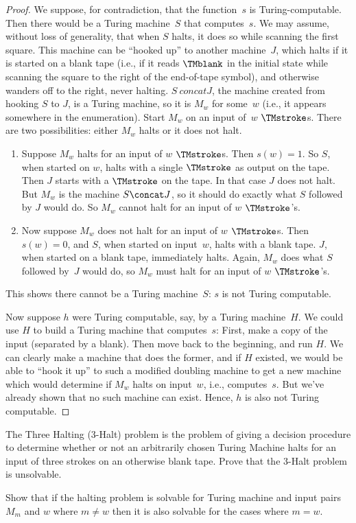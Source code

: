 \documentclass[../../../include/open-logic-section]{subfiles}
\begin{document}
\begin{proof}
We suppose, for contradiction, that the function~$s$ is
Turing-computable.  Then there would be a Turing machine~$S$ that
computes~$s$. We may assume, without loss of generality, that when $S$
halts, it does so while scanning the first square.  This machine can
be ``hooked up'' to another machine~$J$, which halts if it is started on a
blank tape (i.e., if it reads $\TMblank$ in the initial state while
scanning the square to the right of the end-of-tape symbol), and
otherwise wanders off to the right, never halting. $S \ concat J$, the
machine created from hooking $S$ to $J$, is a Turing machine, so it is
$M_w$ for some~$w$ (i.e., it appears somewhere in the enumeration). Start $M_w$
on an input of~$w$ $\TMstroke$s. There are two possibilities: either
$M_w$ halts or it does not halt.
\begin{enumerate}
\item Suppose $M_w$ halts for an input of $w$ $\TMstroke$s. Then $s(w)
  = 1$. So $S$, when started on $w$, halts with a single $\TMstroke$
  as output on the tape.  Then $J$ starts with a $\TMstroke$ on the
  tape. In that case $J$ does not halt. But $M_w$ is the machine $S
  \concat J$, so it should do exactly what $S$ followed by $J$ would
  do.  So $M_w$ cannot halt for an input of $w$ $\TMstroke$'s.

\item Now suppose $M_w$ does not halt for an input of $w$
  $\TMstroke$s.  Then $s(w) = 0$, and $S$, when started on input~$w$,
  halts with a blank tape.  $J$, when started on a blank tape,
  immediately halts.  Again, $M_w$ does what $S$ followed by~$J$ would
  do, so $M_w$ must halt for an input of $w$ $\TMstroke$'s.
\end{enumerate}
This shows there cannot be a Turing machine~$S$: $s$ is not Turing
computable.

Now suppose $h$ were Turing computable, say, by a Turing machine~$H$.
We could use $H$ to build a Turing machine that computes~$s$: First,
make a copy of the input (separated by a blank). Then move back to the
beginning, and run $H$.  We can clearly make a machine that does the
former, and if $H$ existed, we would be able to ``hook it up'' to such
a modified doubling machine to get a new machine which would determine
if $M_w$ halts on input~$w$, i.e., computes~$s$. But we've already
shown that no such machine can exist. Hence, $h$ is also not Turing
computable.
\end{proof}

\begin{prob}
The Three Halting (3-Halt) problem is the problem of giving a decision
procedure to determine whether or not an arbitrarily chosen Turing
Machine halts for an input of three strokes on an otherwise blank
tape. Prove that the 3-Halt problem is unsolvable.
\end{prob}

\begin{prob}
Show that if the halting problem is solvable for Turing machine and
input pairs $M_m$ and $w$ where $m\neq w$ then it is also solvable
for the cases where $m = w$.
\end{prob}
\end{document}
